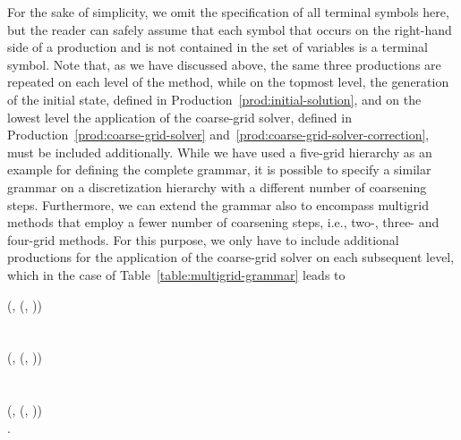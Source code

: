 For the sake of simplicity, we omit the specification of all terminal symbols here, but the reader can safely assume that each symbol that occurs on the right-hand side of a production and is not contained in the set of variables is a terminal symbol.
Note that, as we have discussed above, the same three productions are repeated on each level of the method, while on the topmost level, the generation of the initial state, defined in Production~\eqref{prod:initial-solution}, and on the lowest level the application of the coarse-grid solver, defined in Production~\eqref{prod:coarse-grid-solver} and~\eqref{prod:coarse-grid-solver-correction}, must be included additionally.
While we have used a five-grid hierarchy as an example for defining the complete grammar, it is possible to specify a similar grammar on a discretization hierarchy with a different number of coarsening steps.
Furthermore, we can extend the grammar also to encompass multigrid methods that employ a fewer number of coarsening steps, i.e., two-, three- and four-grid methods.
For this purpose, we only have to include additional productions for the application of the coarse-grid solver on each subsequent level, which in the case of Table~\ref{table:multigrid-grammar} leads to
\begin{bnf*}
	 {
		(, \bnfsp {}(, \bnfsp{}))
	} \\
	 \\ \\
	 {
		(, \bnfsp {}(, \bnfsp{}))
	} \\
	 \\ \\
	 {
		(, \bnfsp {}(, \bnfsp{}))
	} \\
	.
\end{bnf*}
